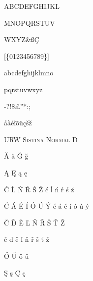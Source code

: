 \documentclass{article}
\begin{document}
\thispagestyle{empty}

\fontsize{48}{56}\selectfont

\begin{centering}

ABCDEFGHIJKL

MNOPQRSTUV

WXYZ\&{\ss}\c{C}

[\{{\guillemotleft}0123456789{\guillemotright}\}]

abcdefghijklmno

pqrstuvwxyz

-?{\textquestiondown}!\${\pounds}''*:;{\texttrademark}{\textdagger}{\textdaggerdbl}

\textcolor{red}{\textparagraph}

\r{a}\`{a}\'{e}\^{i}\~{o}\"{u}\c{c}\v{s}\v{z}

{\fontsize{12}{12}\selectfont \textsc{URW Sistina Normal D}}

\end{centering}

\clearpage

\fontsize{24}{18}\selectfont


\u{A} \u{a} \u{G} \u{g}


\k{A} \k{E} \k{a} \k{e}


\'{C} \'{L} \'{N} \'{R} \'{S} \'{Z} \'{c} \'{l} \'{n} \'{r} \'{s} \'{z}

\'{C} \'{A} \'{E} \'{I} \'{O} \'{U} \'{Y} \'{c} \'{a} \'{e} \'{i} \'{o} \'{u} \'{y}


\v{C} \v{D} \v{E} \v{L} \v{N} \v{R} \v{S} \v{T} \v{Z}

\v{c} \v{d} \v{e} \v{l} \v{n} \v{r} \v{s} \v{t} \v{z}


\H{O} \H{U} \H{o} \H{u}


\c{S} \c{s} \c{C} \c{c}
\end{document}
